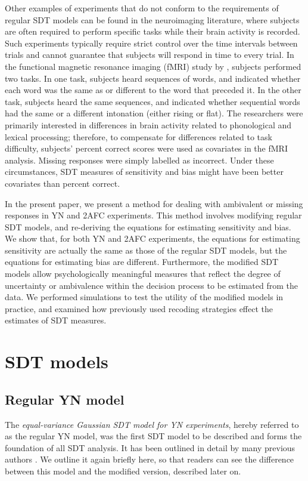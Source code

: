 \documentclass[man]{apa6}
\begin{document}
Other examples of experiments that do not conform to the requirements of regular SDT models can be found in the neuroimaging literature, where subjects are often required to perform specific tasks while their brain activity is recorded. Such experiments typically require strict control over the time intervals between trials and cannot guarantee that subjects will respond in time to every trial. In the functional magnetic resonance imaging (fMRI) study by \textcite{kreitewolfhemispheric2014}, subjects performed two tasks. In one task, subjects heard sequences of words, and indicated whether each word was the same as or different to the word that preceded it. In the other task, subjects heard the same sequences, and indicated whether sequential words had the same or a different intonation (either rising or flat). The researchers were primarily interested in differences in brain activity related to phonological and lexical processing; therefore, to compensate for differences related to task difficulty, subjects' percent correct scores were used as covariates in the fMRI analysis. Missing responses were simply labelled as incorrect. Under these circumstances, SDT measures of sensitivity and bias might have been better covariates than percent correct.

In the present paper, we present a method for dealing with ambivalent or missing responses in YN and 2AFC experiments. This method involves modifying regular SDT models, and re-deriving the equations for estimating sensitivity and bias. We show that, for both YN and 2AFC experiments, the equations for estimating sensitivity are actually the same as those of the regular SDT models, but the equations for estimating bias are different. Furthermore, the modified SDT models allow psychologically meaningful measures that reflect the degree of uncertainty or ambivalence within the decision process to be estimated from the data. We performed simulations to test the utility of the modified models in practice, and examined how previously used recoding strategies \parencite[e.g.,][]{laskowskaemotional2015, kreitewolfhemispheric2014} effect the estimates of SDT measures.

\section{SDT models}
\subsection{Regular YN model}
The \emph{equal-variance Gaussian SDT model for YN experiments}, hereby referred to as the regular YN model, was the first SDT model to be described \parencite{Peterson1954, Tanner1954} and forms the foundation of all SDT analysis. It has been outlined in detail by many previous authors \parencite[e.g.,][]{Green1966, Macmillan2005}. We outline it again briefly here, so that readers can see the difference between this model and the modified version, described later on.
\end{document}
